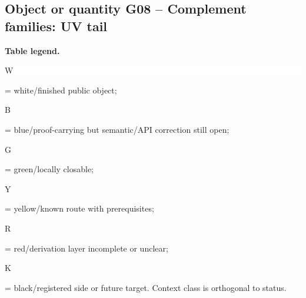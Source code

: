 \subsection*{Object or quantity G08 -- Complement families: UV tail}
\hypertarget{objproof:G08}{}
\par\smallskip\noindent\begin{minipage}{0.99\linewidth}\footnotesize\raggedright\textbf{Table legend.} \colorbox{white}{\strut W} = white/finished public object; \colorbox{cyan!20}{\strut B} = blue/proof-carrying but semantic/API correction still open; \colorbox{green!18}{\strut G} = green/locally closable; \colorbox{yellow!25}{\strut Y} = yellow/known route with prerequisites; \colorbox{red!20}{\strut R} = red/derivation layer incomplete or unclear; \colorbox{black!18}{\strut K} = black/registered side or future target. Context class is orthogonal to status.\end{minipage}\par\vspace{0.25em}
